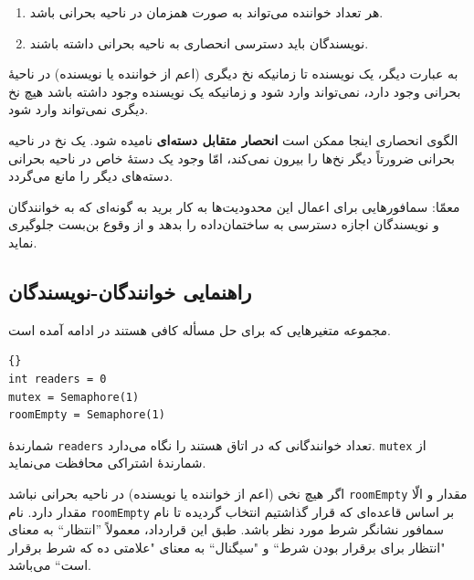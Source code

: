 \documentclass{book}
\newcommand{\clearemptydoublepage}{}%
\begin{document}
\begin{enumerate}

\item 
    هر تعداد خواننده می‌تواند به صورت همزمان در ناحیه بحرانی باشد. 

\item 
    نویسندگان باید دسترسی انحصاری به ناحیه بحرانی داشته باشند. 
\end{enumerate}

    به عبارت دیگر، یک نویسنده تا زمانیکه نخ دیگری (اعم از خواننده یا نویسنده) در ناحیهٔ بحرانی وجود دارد، نمی‌تواند وارد شود و زمانیکه یک نویسنده 
    وجود داشته باشد هیچ نخ دیگری نمی‌تواند وارد شود. 

    الگوی انحصاری اینجا ممکن است \textbf{انحصار متقابل دسته‌ای} نامیده شود. 
    یک نخ در ناحیه بحرانی ضرورتاً دیگر نخ‌ها را بیرون نمی‌کند، امّا وجود یک دستهٔ خاص در ناحیه بحرانی دسته‌های دیگر را مانع می‌گردد. 

    معمّا: سمافورهایی برای اعمال این محدودیت‌ها به کار برید به گونه‌ای که به خوانندگان و نویسندگان اجازه دسترسی به ساختمان‌داده را بدهد و 
    از  وقوع بن‌بست جلوگیری نماید. 


\clearemptydoublepage
\subsection{راهنمایی خوانندگان-نویسندگان}

    مجموعه متغیرهایی که برای حل مسأله کافی هستند در ادامه آمده است. 

\begin{latin}
\begin{lstlisting}[title=\rl{مقداردهی اولیه خوانندگان-نویسندگان}]{}
int readers = 0
mutex = Semaphore(1)
roomEmpty = Semaphore(1)
\end{lstlisting}
\end{latin}

    شمارندهٔ {\tt readers} تعداد خوانندگانی که در اتاق هستند را نگاه می‌دارد.  {\tt mutex} از شمارندهٔ اشتراکی محافظت می‌نماید. 

    
    اگر هیچ نخی (اعم از خواننده یا نویسنده) در ناحیه بحرانی نباشد {\tt roomEmpty}  مقدار   و الّا مقدار  دارد.
    نام {\tt roomEmpty}  بر اساس قاعده‌ای که قرار گذاشتیم انتخاب گردیده تا نام سمافور نشانگر شرط مورد نظر باشد. 
    طبق  این قرارداد، معمولاً ''انتظار`` به معنای "انتظار برای برقرار بودن شرط`` و "سیگنال`` به معنای "علامتی ده که شرط برقرار است`` می‌باشد. 


\clearemptydoublepage
\end{document}
